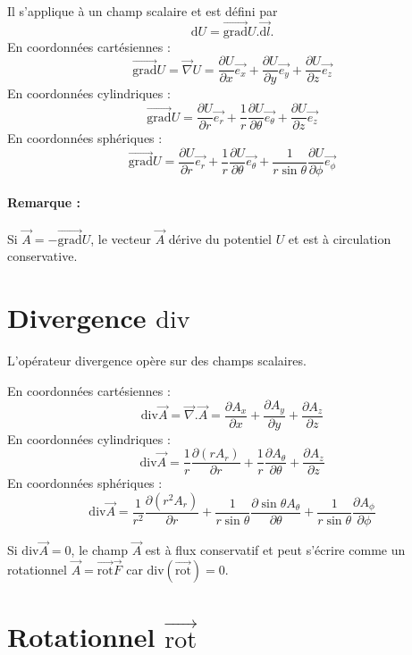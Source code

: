 \documentclass[12pt,a4paper]{article}
\newcommand{\ex}{\overrightarrow{e_x}}
\newcommand{\ey}{\overrightarrow{e_y}}
\newcommand{\ez}{\overrightarrow{e_z}}
\newcommand{\er}{\overrightarrow{e_r}}
\newcommand{\et}{\overrightarrow{e_\theta}}
\newcommand{\ep}{\overrightarrow{e_\phi}}
\renewcommand{\d}{\mathrm{d}}
\newcommand{\grad}{\overrightarrow{\mathrm{grad}}}
\newcommand{\rot}{\overrightarrow{\mathrm{rot}}}
\renewcommand{\div}{\mathrm{div}}
\begin{document}
Il s'applique à un champ scalaire et est défini par
\begin{equation*}
\d U = \grad U.\overrightarrow{\d l}.
\end{equation*}
En coordonnées cartésiennes :
\begin{equation*}
\grad U = \overrightarrow{\nabla} U = \frac{\partial U}{\partial x}\ex + \frac{\partial U}{\partial y}\ey + \frac{\partial U}{\partial z}\ez
\end{equation*}
En coordonnées cylindriques :
\begin{equation*}
\grad U = \frac{\partial U}{\partial r}\er + \frac{1}{r}\frac{\partial U}{\partial \theta}\et + \frac{\partial U}{\partial z}\ez
\end{equation*}
En coordonnées sphériques :
\begin{equation*}
\grad U = \frac{\partial U}{\partial r}\er + \frac{1}{r}\frac{\partial U}{\partial \theta}\et + \frac{1}{r\sin\theta}\frac{\partial U}{\partial \phi}\ep
\end{equation*}

\paragraph*{Remarque :} Si $\overrightarrow{A} = -\grad U$, le vecteur $\overrightarrow{A}$ dérive du potentiel $U$ et est à circulation conservative.

\section*{Divergence $\div$}

L'opérateur divergence opère sur des champs scalaires.

En coordonnées cartésiennes :
\begin{equation*}
\div\overrightarrow{A} = \overrightarrow{\nabla}.\overrightarrow{A} = \frac{\partial A_x}{\partial x} + \frac{\partial A_y}{\partial y} + \frac{\partial A_z}{\partial z}
\end{equation*}
En coordonnées cylindriques :
\begin{equation*}
\div\overrightarrow{A} = \frac{1}{r}\frac{\partial (rA_r)}{\partial r} + \frac{1}{r}\frac{\partial A_\theta}{\partial \theta} + \frac{\partial A_z}{\partial z}
\end{equation*}
En coordonnées sphériques :
\begin{equation*}
\div\overrightarrow{A} = \frac{1}{r^2}\frac{\partial (r^2A_r)}{\partial r} + \frac{1}{r\sin\theta}\frac{\partial \sin\theta A_\theta}{\partial \theta} + \frac{1}{r\sin\theta}\frac{\partial A_\phi}{\partial \phi}
\end{equation*}

Si $\div \overrightarrow{A} = 0$, le champ $\overrightarrow{A}$ est à flux conservatif et peut s'écrire comme un rotationnel $\overrightarrow{A} = \rot\overrightarrow{F}$ car $\div(\rot) = 0$.

\section*{Rotationnel $\rot$}
\end{document}
